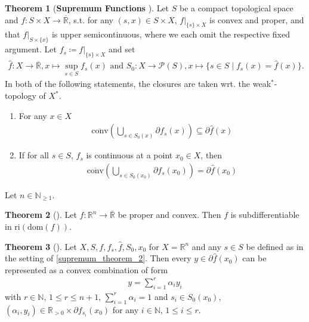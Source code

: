 \documentclass[10pt, leqno]{amsart}
\theoremstyle{definition}
\newtheorem{theorem}{Theorem}[section]
\theoremstyle{remark}
\begin{document}
    \begin{theorem}[{\textbf{Supremum Functions} \cite[pp. 201-204]{IoffeTihomirov}}] \label{supremum_theorem}
        Let \(S\) be a compact topological space and \(f\colon S \times X \to \overline{\mathbb{R}}\), s.t. for any \((s, x) \in S \times X\), \(f|_{\{s\} \times X}\) is convex and proper, and that \(f|_{S \times \{x\}}\) is upper semicontinuous, where we each omit the respective fixed argument. Let \(f_s \coloneqq f|_{\{s\} \times X}\) and set
        \begin{align}
            \hat{f}\colon X \to \overline{\mathbb{R}}, x \mapsto \sup_{s \in S} f_s(x) \text{ and } S_0\colon X \to \mathcal{P}(S), x \mapsto \{s \in S \mid f_s(x) = \hat{f}(x)\}.
        \end{align}
        In both of the following statements, the closures are taken wrt. the weak\({}^*\)-topology of \(X^*\).
        \begin{enumerate}[label=(\roman*), wide]
            \item \label{supremum_theorem_1} For any \(x \in X\)
            \begin{align}
                \overline{\text{conv}}\left(\bigcup_{s \in S_0(x)} \partial f_s(x)\right) \subseteq \partial \hat{f}(x)
            \end{align}
            \item \label{supremum_theorem_2} If for all \(s \in S\), \(f_s\) is continuous at a point \(x_0 \in X\), then
            \begin{align}
                \overline{\text{conv}}\left(\bigcup_{s \in S_0(x_0)} \partial f_s(x_0)\right) = \partial \hat{f}(x_0)
            \end{align}
        \end{enumerate}
    \end{theorem}

    Let \(n \in \mathbb{N}_{\geq 1}\).

    \begin{theorem}[{\cite[p. 204]{IoffeTihomirov}}]
        Let \(f\colon \mathbb{R}^n \to \overline{\mathbb{R}}\) be proper and convex. Then \(f\) is subdifferentiable in \(\text{ri}(\text{dom}(f))\).
    \end{theorem}

    \begin{theorem}[{\cite[pp. 204-205]{IoffeTihomirov}}] \label{finite_dim_representation_theorem}
        Let \(X, S, f, f_s, \hat{f}, S_0, x_0\) for \(X = \mathbb{R}^n\) and any \(s \in S\) be defined as in the setting of  \ref{supremum_theorem_2}. Then every \(y \in \partial \hat{f}(x_0)\) can be represented as a convex combination of form
        \begin{align}
            y = \sum_{i=1}^r \alpha_i y_i
        \end{align}
        with \(r \in \mathbb{N}\), \(1 \leq r \leq n+1\), \(\sum_{i=1}^r \alpha_i = 1\) and \(s_i \in S_0(x_0)\), \((\alpha_i, y_i) \in \mathbb{R}_{>0} \times \partial f_{s_i}(x_0)\) for any \(i \in \mathbb{N}\), \(1 \leq i \leq r\).
    \end{theorem}

    \printbibliography{}
\end{document}
